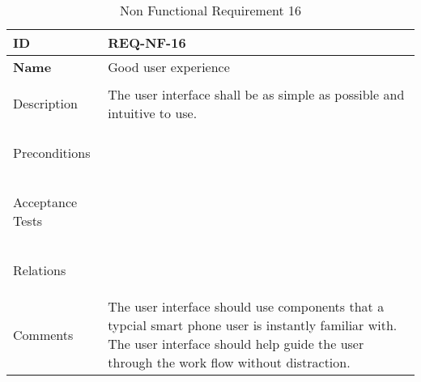 \begin{table}[H]
    \begin{tabular}[t]{ | >{\bfseries}l | p{9.5cm} |}

    \hline
    ID
    &  REQ-NF-16 \\ \hline

    Name
    & Good user experience \\ \hline

    Description
    & The user interface shall be as simple as possible and intuitive to use.  \\ \hline

    Preconditions
    &  \\ \hline

    Acceptance Tests
    & \\ \hline

    Relations
    &  \\ \hline

    Comments
    & The user interface should use components that a typcial smart phone user is instantly familiar with. The user interface should help guide the user through the work flow without distraction.  \\ \hline

    \end{tabular}

    \caption{Non Functional Requirement 16}
    \label{fig:req_nf_16}

\end{table}